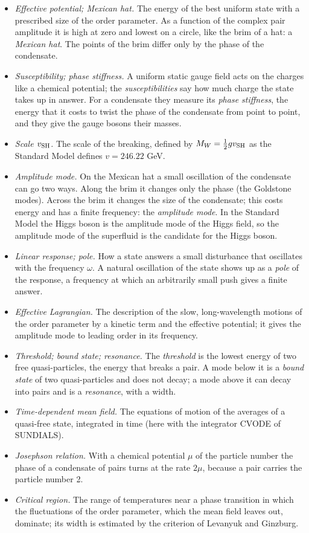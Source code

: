 \documentclass[
  10pt,
]{article}
\providecommand{\tightlist}{%
  \setlength{\itemsep}{0pt}\setlength{\parskip}{0pt}}
\begin{document}
\begin{itemize}
\tightlist
\item
  \emph{Effective potential; Mexican hat.} The energy of the best
  uniform state with a prescribed size of the order parameter. As a
  function of the complex pair amplitude it is high at zero and lowest
  on a circle, like the brim of a hat: a \emph{Mexican hat}. The points
  of the brim differ only by the phase of the condensate.
\item
  \emph{Susceptibility; phase stiffness.} A uniform static gauge field
  acts on the charges like a chemical potential; the
  \emph{susceptibilities} say how much charge the state takes up in
  answer. For a condensate they measure its \emph{phase stiffness}, the
  energy that it costs to twist the phase of the condensate from point
  to point, and they give the gauge bosons their masses.
\item
  \emph{Scale \(v_{\rm SH}\).} The scale of the breaking, defined by
  \(M_W=\tfrac12gv_{\rm SH}\) as the Standard Model defines \(v=246.22\)
  GeV.
\item
  \emph{Amplitude mode.} On the Mexican hat a small oscillation of the
  condensate can go two ways. Along the brim it changes only the phase
  (the Goldstone modes). Across the brim it changes the size of the
  condensate; this costs energy and has a finite frequency: the
  \emph{amplitude mode}. In the Standard Model the Higgs boson is the
  amplitude mode of the Higgs field, so the amplitude mode of the
  superfluid is the candidate for the Higgs boson.
\item
  \emph{Linear response; pole.} How a state answers a small disturbance
  that oscillates with the frequency \(\omega\). A natural oscillation
  of the state shows up as a \emph{pole} of the response, a frequency at
  which an arbitrarily small push gives a finite answer.
\item
  \emph{Effective Lagrangian.} The description of the slow,
  long-wavelength motions of the order parameter by a kinetic term and
  the effective potential; it gives the amplitude mode to leading order
  in its frequency.
\item
  \emph{Threshold; bound state; resonance.} The \emph{threshold} is the
  lowest energy of two free quasi-particles, the energy that breaks a
  pair. A mode below it is a \emph{bound state} of two quasi-particles
  and does not decay; a mode above it can decay into pairs and is a
  \emph{resonance}, with a width.
\item
  \emph{Time-dependent mean field.} The equations of motion of the
  averages of a quasi-free state, integrated in time (here with the
  integrator CVODE of SUNDIALS).
\item
  \emph{Josephson relation.} With a chemical potential \(\mu\) of the
  particle number the phase of a condensate of pairs turns at the rate
  \(2\mu\), because a pair carries the particle number 2.
\item
  \emph{Critical region.} The range of temperatures near a phase
  transition in which the fluctuations of the order parameter, which the
  mean field leaves out, dominate; its width is estimated by the
  criterion of Levanyuk and Ginzburg.
\end{itemize}
\end{document}

